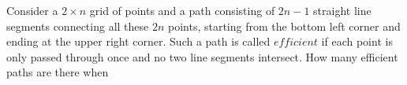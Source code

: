 Consider a $2 \times n$ grid of points and a path consisting of $2n-1$ straight line segments connecting all these $2n$ points, starting from the bottom left corner and ending at the upper right corner. Such a path is called $\textit{efficient}$ if each point is only passed through once and no two line segments intersect. How many efficient paths are there when 